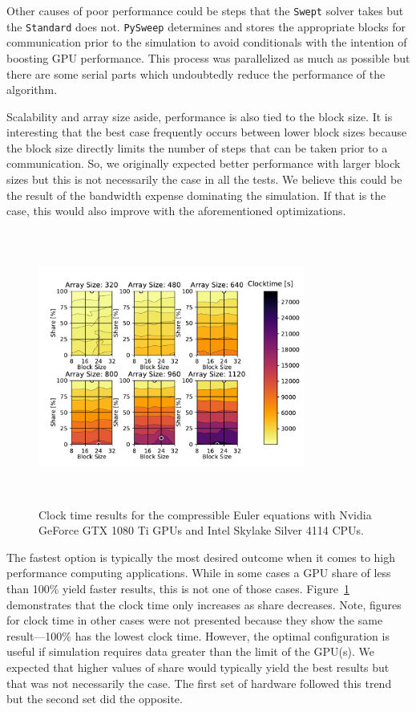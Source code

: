 \documentclass[preprints,article,accept,moreauthors,pdftex]{Definitions/mdpi}
\def\pysweep{\texttt{PySweep}}
\def\Swept{\texttt{Swept}}
\def\Standard{\texttt{Standard}}
\def\oldCPU{Intel Skylake Silver 4114} %
\def\oldGPU{Nvidia GeForce GTX 1080 Ti}
\begin{document}
Other causes of poor performance could be steps that the \Swept{} solver takes but the \Standard{} does not. \pysweep{} determines and stores the appropriate blocks for communication prior to the simulation to avoid conditionals with the intention of boosting GPU performance. This process was parallelized as much as possible but there are some serial parts which undoubtedly reduce the performance of the algorithm. 

Scalability and array size aside, performance is also tied to the block size. It is interesting that the best case frequently occurs between lower block sizes because the block size directly limits the number of steps that can be taken prior to a communication. So, we originally expected better performance with larger block sizes but this is not necessarily the case in all the tests. We believe this could be the result of the bandwidth expense dominating the simulation. If that is the case, this would also improve with the aforementioned optimizations.


\begin{figure}[H]
    
    \begin{center}
        \includegraphics[height=9cm,width=0.78\textwidth, trim={0.5cm 0.4cm 0.5cm 0.2cm},clip]{figs/clockTimeSwepteulerOld.pdf}
        \caption{Clock time results  for the compressible Euler equations with \oldGPU{} GPUs and \oldCPU{} CPUs.}
        \label{fig:clocktimeOldEuler}
    \end{center}
\end{figure}



The fastest option is typically the most desired outcome when it comes to high performance computing applications. While in some cases a GPU share of less than 100\% yield faster results, this is not one of those cases. Figure~\ref{fig:clocktimeOldEuler} demonstrates that the clock time only increases as share decreases. Note, figures for clock time in other cases were not presented because they show the same result---100\% has the lowest clock time. However, the optimal configuration is useful if simulation requires data greater than the limit of the GPU(s). We expected that higher values of share would typically yield the best results but that was not necessarily the case. The first set of hardware followed this trend but the second set did the opposite. 
\end{document}
